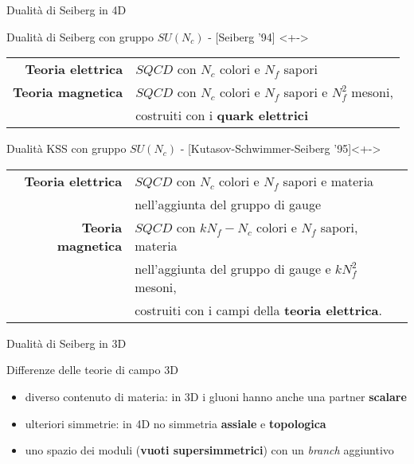 \documentclass[10pt,compress,usenames,dvipsnames]{beamer}
\begin{document}
\begin{frame}{Dualità di Seiberg in 4D}

\begin{block}{Dualità di Seiberg con gruppo $SU(N_c)$ - [Seiberg '94] }<+->
\begin{tabular}{r l}
{\bfseries  Teoria elettrica} &   $SQCD$ con $N_c$ colori e $N_f$ sapori \\[0.1cm]
{\bfseries   Teoria magnetica} &   $SQCD$ con $N_c$ colori e $N_f$ sapori e 
 $N_f^2$  mesoni,  \\ 
 & costruiti con i \alert{\bfseries quark elettrici}\\
\end{tabular}
\end{block}

\vspace{0.5cm}


\begin{block}{Dualità KSS con gruppo $SU(N_c)$ - [Kutasov-Schwimmer-Seiberg '95]}<+->
\begin{tabular}{r l}
{\bfseries  Teoria elettrica}  &  $SQCD$ con $N_c$ colori e $N_f$ sapori e  materia \\ &  nell'aggiunta del gruppo di gauge  \\[0.1cm]
{\bfseries  Teoria magnetica}  &  $SQCD$ con $k N_f - N_c$ colori e $N_f$ sapori, materia \\  & nell'aggiunta del gruppo di gauge  e  $k N_f^2$ mesoni, \\
&  costruiti con i campi della \alert{\bfseries teoria elettrica}.
\end{tabular}
\end{block}
\vfill 
\end{frame}



\begin{frame}{Dualità di Seiberg in 3D}
\begin{block}{Differenze delle teorie di campo 3D}
\begin{itemize}
\item diverso contenuto di materia: in 3D i gluoni hanno anche una partner \alert{\bfseries scalare} 
\item ulteriori simmetrie: in 4D no simmetria \alert{\bfseries assiale} e \alert{\bfseries topologica} 
\item uno spazio dei moduli (\alert{\bfseries vuoti supersimmetrici}) con un \emph{branch} aggiuntivo  
\end{itemize}
\end{block}

\end{frame}
\end{document}
